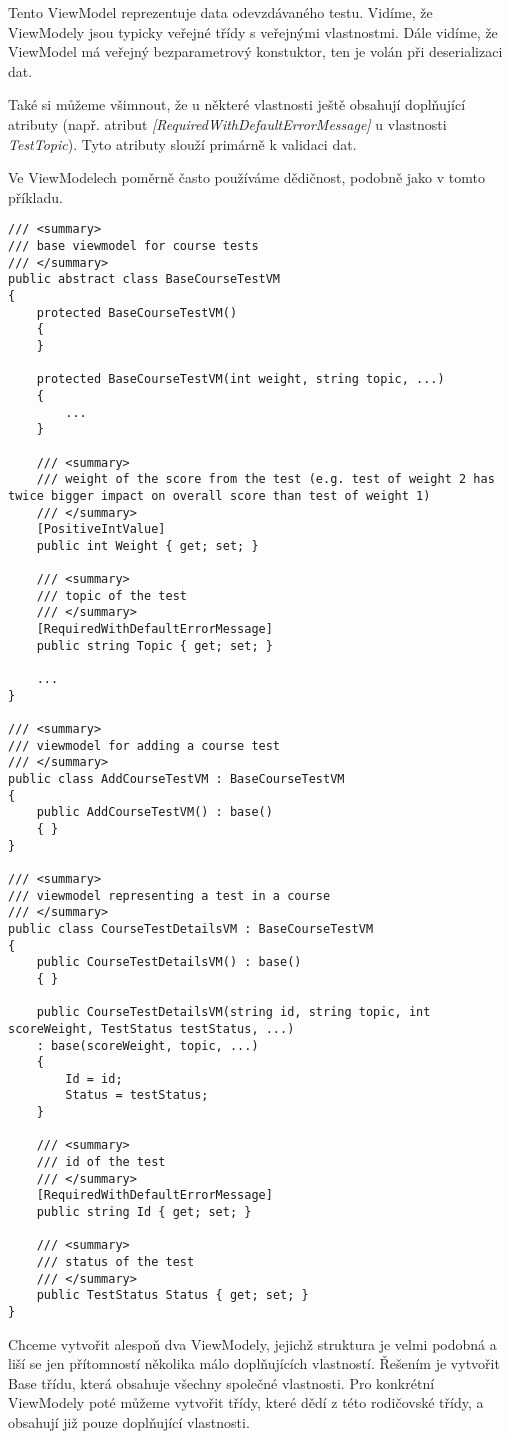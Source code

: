 Tento ViewModel reprezentuje data odevzdávaného testu. Vidíme, že ViewModely jsou typicky veřejné třídy s veřejnými vlastnostmi. Dále vidíme, že ViewModel má veřejný bezparametrový konstuktor, ten je volán při deserializaci dat.

Také si můžeme všimnout, že u některé vlastnosti ještě obsahují doplňující atributy (např. atribut \textit{[RequiredWithDefaultErrorMessage]} u vlastnosti \textit{TestTopic}). Tyto atributy slouží primárně k validaci dat.

Ve ViewModelech poměrně často používáme dědičnost, podobně jako v tomto příkladu.

\begin{lstlisting}
/// <summary>
/// base viewmodel for course tests
/// </summary>
public abstract class BaseCourseTestVM
{
	protected BaseCourseTestVM()
	{
	}
	
	protected BaseCourseTestVM(int weight, string topic, ...)
	{
		...
	}
	
	/// <summary>
	/// weight of the score from the test (e.g. test of weight 2 has twice bigger impact on overall score than test of weight 1)
	/// </summary>
	[PositiveIntValue]
	public int Weight { get; set; }
	
	/// <summary>
	/// topic of the test
	/// </summary>
	[RequiredWithDefaultErrorMessage]
	public string Topic { get; set; }

	...
}

/// <summary>
/// viewmodel for adding a course test
/// </summary>
public class AddCourseTestVM : BaseCourseTestVM
{
	public AddCourseTestVM() : base()
	{ }
}

/// <summary>
/// viewmodel representing a test in a course
/// </summary>
public class CourseTestDetailsVM : BaseCourseTestVM
{
	public CourseTestDetailsVM() : base()
	{ }
	
	public CourseTestDetailsVM(string id, string topic, int scoreWeight, TestStatus testStatus, ...)
	: base(scoreWeight, topic, ...)
	{
		Id = id;
		Status = testStatus;
	}
	
	/// <summary>
	/// id of the test
	/// </summary>
	[RequiredWithDefaultErrorMessage]
	public string Id { get; set; }
	
	/// <summary>
	/// status of the test
	/// </summary>
	public TestStatus Status { get; set; }
}
\end{lstlisting}
Chceme vytvořit alespoň dva ViewModely, jejichž struktura je velmi podobná a liší se jen přítomností několika málo doplňujících vlastností. Řešením je vytvořit Base třídu, která obsahuje všechny společné vlastnosti. Pro konkrétní ViewModely poté můžeme vytvořit třídy, které dědí z této rodičovské třídy, a obsahují již pouze doplňující vlastnosti.

